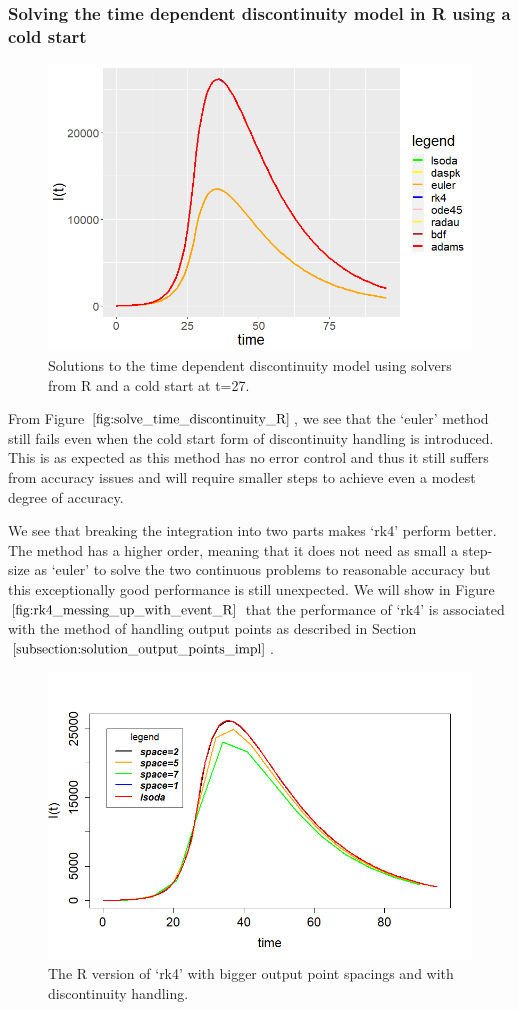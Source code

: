 \subsubsection{Solving the time dependent discontinuity model in R using a cold start} 
\begin{figure}[H]
\centering
\includegraphics[width=0.7\linewidth]{./figures/solve_time_discontinuity_R}
\caption{Solutions to the time dependent discontinuity model using solvers from R and a cold start at t=27.}
\label{fig:solve_time_discontinuity_R}
\end{figure}
From Figure $\ref{fig:solve_time_discontinuity_R}$, we see that the `euler' method still fails even when the cold start form of discontinuity handling is introduced. This is as expected as this method has no error control and thus it still suffers from accuracy issues and will require smaller steps to achieve even a modest degree of accuracy.

We see that breaking the integration into two parts makes `rk4' perform better. The method has a higher order, meaning that it does not need as small a step-size as `euler' to solve the two continuous problems to reasonable accuracy but this exceptionally good performance is still unexpected. We will show in Figure $\ref{fig:rk4_messing_up_with_event_R}$ that the performance of `rk4' is associated with the method of handling output points as described in Section $\ref{subsection:solution_output_points_impl}$.

\begin{figure}[H]
\centering
\includegraphics[width=0.7\linewidth]{./figures/rk4_messing_up_with_event_R}
\caption{The R version of `rk4' with bigger output point spacings and with discontinuity handling.}
\label{fig:rk4_messing_up_with_event_R}
\end{figure}

